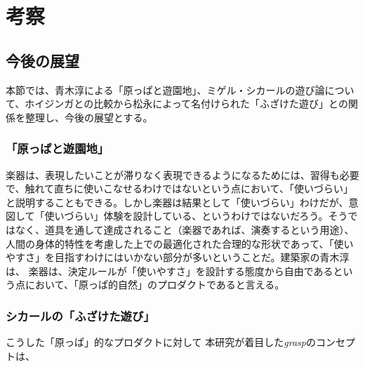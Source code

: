 \chapter{考察}

\section{今後の展望}
本節では、青木淳による「原っぱと遊園地」、ミゲル・シカールの遊び論について、ホイジンガとの比較から松永によって名付けられた「ふざけた遊び」との関係を整理し、今後の展望とする。

\subsection{「原っぱと遊園地」}
楽器は、表現したいことが滞りなく表現できるようになるためには、習得も必要で、触れて直ちに使いこなせるわけではないという点において、「使いづらい」と説明することもできる。しかし楽器は結果として「使いづらい」わけだが、意図して「使いづらい」体験を設計している、というわけではないだろう。そうではなく、道具を通して達成されること（楽器であれば、演奏するという用途）、人間の身体的特性を考慮した上での最適化された合理的な形状であって、「使いやすさ」を目指すわけにはいかない部分が多いということだ。建築家の青木淳は、
楽器は、決定ルールが「使いやすさ」を設計する態度から自由であるという点において、「原っぱ的自然」のプロダクトであると言える。

\subsection{シカールの「ふざけた遊び」}
こうした「原っぱ」的なプロダクトに対して
本研究が着目した\textit{grasp}のコンセプトは、